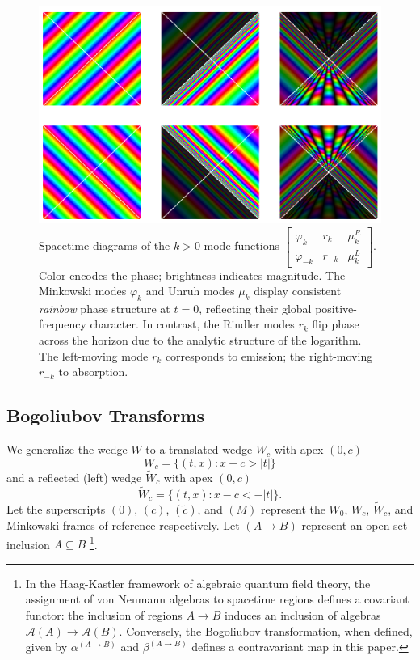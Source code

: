 \documentclass[12pt,a4paper]{article}
\begin{document}
\begin{figure}[h]
\centering
\includegraphics[scale=0.5]{unruh_mode_rainbow.png}
\captionsetup{width=0.7\textwidth}
\caption{Spacetime diagrams of the $k>0$ mode functions $\left[\begin{array}{ccc} \varphi_k & r_k & \mu^R_k \\ \varphi_{-k} & r_{-k} & \mu^L_k \end{array} \right]$. Color encodes the phase; brightness indicates magnitude. The Minkowski modes $\varphi_k$ and Unruh modes $\mu_k$ display consistent {\it rainbow} phase structure at $t=0$, reflecting their global positive-frequency character. In contrast, the Rindler modes $r_k$ flip phase across the horizon due to the analytic structure of the logarithm. The left-moving mode $r_k$ corresponds to emission; the right-moving $r_{-k}$ to absorption.}
\label{unruh_rainbow}
\end{figure}

\subsection{Bogoliubov Transforms}
We generalize the wedge $W$ to a translated wedge $W_c$ with apex $(0,c)$
\begin{equation}
 W_c = \{(t,x) : x - c > |t|\} 
\end{equation}
and a reflected (left) wedge $\widetilde{W}_c$ with apex $(0,c)$
\begin{equation}
 \widetilde{W}_c = \{(t,x) : x - c < -|t|\}.
\end{equation}
Let the superscripts $(0)$, $(c)$, $(\widetilde{c})$, and $(M)$ represent the $W_0$, $W_c$, $\widetilde{W}_c$, and Minkowski frames of reference respectively.  Let $(A \rightarrow B)$ represent an open set inclusion $A \subseteq B$ \footnote{In the Haag-Kastler framework\cite{haag1964algebraic} of algebraic quantum field theory, the assignment of von Neumann algebras to spacetime regions defines a covariant functor: the inclusion of regions $A \rightarrow B$ induces an inclusion of algebras $\mathcal{A}(A) \rightarrow \mathcal{A}(B)$. Conversely, the Bogoliubov transformation, when defined, given by $\alpha^{(A \rightarrow B)}$ and $\beta^{(A \rightarrow B)}$ defines a contravariant map in this paper.}.
\end{document}
